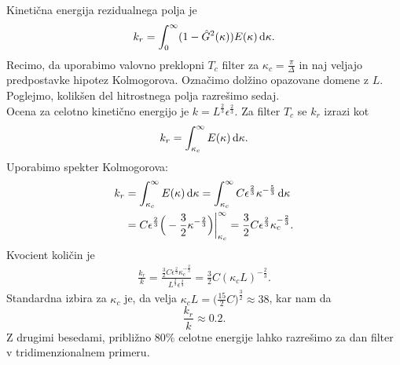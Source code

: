 \documentclass[mat2, tisk]{fmfdelo}
\begin{document}
\begin{primer}
Kinetična energija rezidualnega polja je 
$$
k_r = \int_{0}^{\infty} (1 - \hat{G}^2(\kappa)) E(\kappa) \dif \kappa.
$$
Recimo, da uporabimo valovno preklopni $T_c$ filter za $\kappa_c = \frac{\pi}{\Delta}$ in naj veljajo
predpostavke hipotez Kolmogorova. Označimo dolžino opazovane domene z $L$. 
Poglejmo, kolikšen del hitrostnega polja razrešimo sedaj. \\

Ocena za celotno kinetično energijo je $k = L^\frac{2}{3} \epsilon^\frac{2}{3}$. 
Za filter $T_c$ se $k_r$ izrazi kot 
$$
k_r = \int_{\kappa_c}^{\infty} E(\kappa) \dif \kappa. 
$$
Uporabimo spekter Kolmogorova: 
\begin{align*}
k_r &= \int_{\kappa_c}^{\infty} E(\kappa) \dif \kappa = \int_{\kappa_c}^{\infty} C \epsilon^{\frac{2}{3}} \kappa^{-\frac{5}{3}} \dif \kappa \\
&= C \epsilon^{\frac{2}{3}} \Big(- \frac{3}{2} \kappa^{-\frac{2}{3}}\Big)\Big|_{\kappa_c}^\infty = \frac{3}{2} C \epsilon^{\frac{2}{3}}\kappa_c^{-\frac{2}{3}}.
\end{align*}
Kvocient količin je 
\begin{align*}
\frac{k_r}{k} = \frac{\frac{3}{2} C \epsilon^{\frac{2}{3}}\kappa_c^{-\frac{2}{3}}}{L^\frac{2}{3} \epsilon^\frac{2}{3}} = 
\frac{3}{2}C (\kappa_c L)^{-\frac{2}{3}}.
\end{align*}
Standardna izbira za $\kappa_c$ je, da velja $\kappa_c L = \Big(\frac{15}{2}C\Big)^\frac{3}{2} \approx 38$, 
kar nam da 
$$
\frac{k_r}{k} \approx 0.2.
$$
Z drugimi besedami, približno $80\%$ celotne energije lahko razrešimo 
za dan filter v tridimenzionalnem primeru.
\end{primer}
\end{document}
